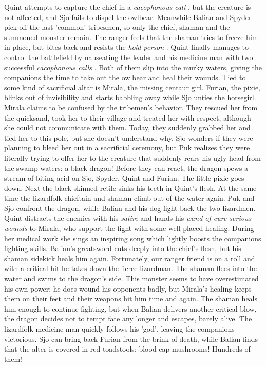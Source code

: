 Quint attempts to capture the chief in a {\itshape cacophonous call} , but the creature is not affected, and Sjo fails to dispel the owlbear. Meanwhile Balian and Spyder pick off the last 'common' tribesmen, so only the chief, shaman and the summoned monster remain. The ranger feels that the shaman tries to freeze him in place, but bites back and resists the  {\itshape hold person} . Quint finally manages to control the battlefield by nauseating the leader and his medicine man with two successful  {\itshape cacophonous calls} . Both of them slip into the murky waters, giving the companions the time to take out the owlbear and heal their wounds. Tied to some kind of sacrificial altar is Mirala, the missing centaur girl. Furian, the pixie, blinks out of invisibility and starts babbling away while Sjo unties the horsegirl. Mirala claims to be confused by the tribemen's behavior. They rescued her from the quicksand, took her to their village and treated her with respect, although she could not communicate with them. Today, they suddenly grabbed her and tied her to this pole, but she doesn't understand why. Sjo wonders if they were planning to bleed her out in a sacrificial ceremony, but Puk realizes they were literally trying to offer her to the creature that suddenly rears his ugly head from the swamp waters: a black dragon! Before they can react, the dragon spews a stream of biting acid on Sjo, Spyder, Quint and Furian. The little pixie goes down. Next the black-skinned retile sinks his teeth in Quint's flesh. At the same time the lizardfolk chieftain and shaman climb out of the water again. Puk and Sjo confront the dragon, while Balian and his dog fight back the two lizardmen. Quint distracts the enemies with his {\itshape satire} and hands his  {\itshape wand of cure serious wounds} to Mirala, who support the fight with some well-placed healing. During her medical work she sings an inspiring song which lightly boosts the companions fighting skills. Balian's greatsword cuts deeply into the chief's flesh, but his shaman sidekick heals him again. Fortunately, our ranger friend is on a roll and with a critical hit he takes down the fierce lizardman. The shaman flees into the water and swims to the dragon's side. This monster seems to have overestimated his own power: he does wound his opponents badly, but Mirala's healing keeps them on their feet and their weapons hit him time and again. The shaman heals him enough to continue fighting, but when Balian delivers another critical blow, the dragon decides not to tempt fate any longer and escapes, barely alive. The lizardfolk medicine man quickly follows his 'god', leaving the companions victorious. Sjo can bring back Furian from the brink of death, while Balian finds that the alter is covered in red toadstools: blood cap mushrooms! Hundreds of them!\\

